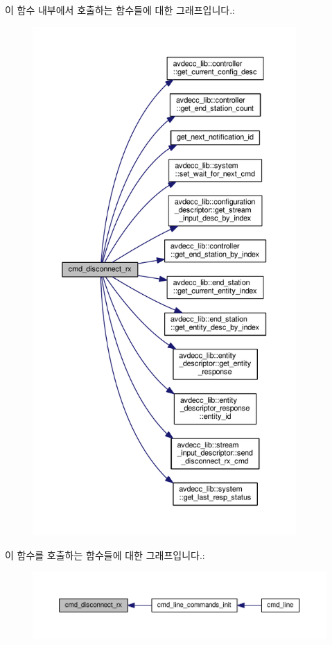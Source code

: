 이 함수 내부에서 호출하는 함수들에 대한 그래프입니다.\+:
\nopagebreak
\begin{figure}[H]
\begin{center}
\leavevmode
\includegraphics[height=550pt]{classcmd__line_a5cdfb276705d76d2f6046c4e5cdf56f4_cgraph}
\end{center}
\end{figure}




이 함수를 호출하는 함수들에 대한 그래프입니다.\+:
\nopagebreak
\begin{figure}[H]
\begin{center}
\leavevmode
\includegraphics[width=350pt]{classcmd__line_a5cdfb276705d76d2f6046c4e5cdf56f4_icgraph}
\end{center}
\end{figure}


